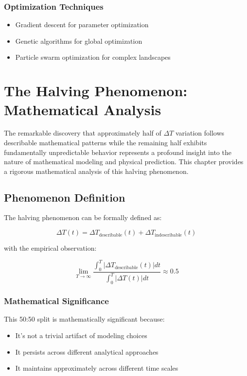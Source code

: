 \documentclass[12pt,a4paper]{report}
\begin{document}
\subsection{Optimization Techniques}

\begin{itemize}
\item Gradient descent for parameter optimization
\item Genetic algorithms for global optimization
\item Particle swarm optimization for complex landscapes
\end{itemize}

\chapter{The Halving Phenomenon: Mathematical Analysis}

The remarkable discovery that approximately half of $\Delta T$ variation follows describable mathematical patterns while the remaining half exhibits fundamentally unpredictable behavior represents a profound insight into the nature of mathematical modeling and physical prediction. This chapter provides a rigorous mathematical analysis of this halving phenomenon.

\section{Phenomenon Definition}

The halving phenomenon can be formally defined as:

\[
\Delta T(t) = \Delta T_{\text{describable}}(t) + \Delta T_{\text{indescribable}}(t)
\]

with the empirical observation:

\[
\lim_{T \to \infty} \frac{\int_0^T |\Delta T_{\text{describable}}(t)| dt}{\int_0^T |\Delta T(t)| dt} \approx 0.5
\]

\subsection{Mathematical Significance}

This 50:50 split is mathematically significant because:

\begin{itemize}
\item It's not a trivial artifact of modeling choices
\item It persists across different analytical approaches
\item It maintains approximately across different time scales
\end{itemize}
\end{document}
